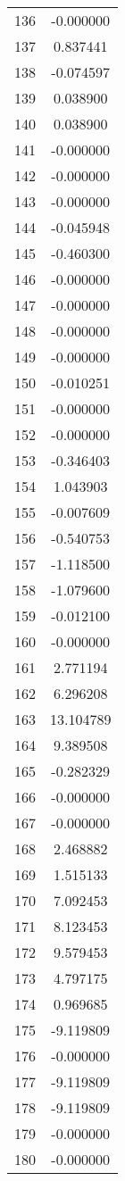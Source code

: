 \documentclass[12pt]{article}
\begin{document}
\begin{longtable}{@{}cc@{}}
136 & -0.000000 \\
137 & 0.837441 \\
138 & -0.074597 \\
139 & 0.038900 \\
140 & 0.038900 \\
141 & -0.000000 \\
142 & -0.000000 \\
143 & -0.000000 \\
144 & -0.045948 \\
145 & -0.460300 \\
146 & -0.000000 \\
147 & -0.000000 \\
148 & -0.000000 \\
149 & -0.000000 \\
150 & -0.010251 \\
151 & -0.000000 \\
152 & -0.000000 \\
153 & -0.346403 \\
154 & 1.043903 \\
155 & -0.007609 \\
156 & -0.540753 \\
157 & -1.118500 \\
158 & -1.079600 \\
159 & -0.012100 \\
160 & -0.000000 \\
161 & 2.771194 \\
162 & 6.296208 \\
163 & 13.104789 \\
164 & 9.389508 \\
165 & -0.282329 \\
166 & -0.000000 \\
167 & -0.000000 \\
168 & 2.468882 \\
169 & 1.515133 \\
170 & 7.092453 \\
171 & 8.123453 \\
172 & 9.579453 \\
173 & 4.797175 \\
174 & 0.969685 \\
175 & -9.119809 \\
176 & -0.000000 \\
177 & -9.119809 \\
178 & -9.119809 \\
179 & -0.000000 \\
180 & -0.000000 \\

\end{longtable}
\end{document}
